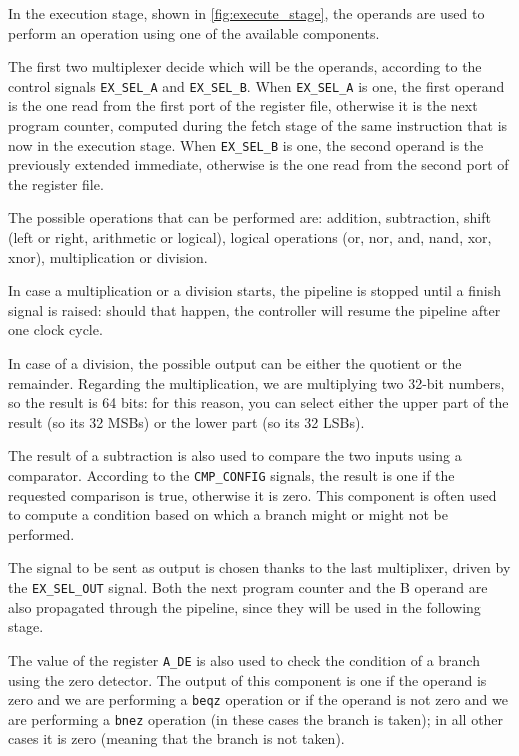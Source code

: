 In the execution stage, shown in \autoref{fig:execute_stage}, the operands are used to perform an operation using one of the available components.

The first two multiplexer decide which will be the operands, according to the control signals \texttt{EX\_SEL\_A} and \texttt{EX\_SEL\_B}. 
When \texttt{EX\_SEL\_A} is one, the first operand is the one read from the first port of the register file, otherwise it is the next program counter, computed during the fetch stage of the same instruction that is now in the execution stage.
When \texttt{EX\_SEL\_B} is one, the second operand is the previously extended immediate, otherwise is the one read from the second port of the register file.

The possible operations that can be performed are: addition, subtraction, shift (left or right, arithmetic or logical), logical operations (or, nor, and, nand, xor, xnor), multiplication or division. 

In case a multiplication or a division starts, the pipeline is stopped until a finish signal is raised: should that happen, the controller will resume the pipeline after one clock cycle.

In case of a division, the possible output can be either the quotient or the remainder.
Regarding the multiplication, we are multiplying two 32-bit numbers, so the result is 64 bits: for this reason, you can select either the upper part of the result (so its 32 MSBs) or the lower part (so its 32 LSBs).

The result of a subtraction is also used to compare the two inputs using a comparator. 
According to the \texttt{CMP\_CONFIG} signals, the result is one if the requested comparison is true, otherwise it is zero.
This component is often used to compute a condition based on which a branch might or might not be performed.

The signal to be sent as output is chosen thanks to the last multiplixer, driven by the \texttt{EX\_SEL\_OUT} signal.
Both the next program counter and the B operand are also propagated through the pipeline, since they will be used in the following stage. 

The value of the register \texttt{A\_DE} is also used to check the condition of a branch using the zero detector. 
The output of this component is one if the operand is zero and we are performing a \texttt{beqz} operation or if the operand is not zero and we are performing a \texttt{bnez} operation (in these cases the branch is taken); in all other cases it is zero (meaning that the branch is not taken). 

